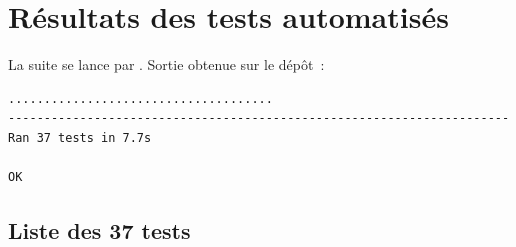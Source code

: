 \chapter{Résultats des tests automatisés}
\label{ann:tests}

La suite se lance par . Sortie obtenue sur le dépôt~:

\begin{lstlisting}[language={}, numbers=none, basicstyle=\ttfamily\scriptsize]
.....................................
----------------------------------------------------------------------
Ran 37 tests in 7.7s

OK
\end{lstlisting}

\section{Liste des 37 tests}

